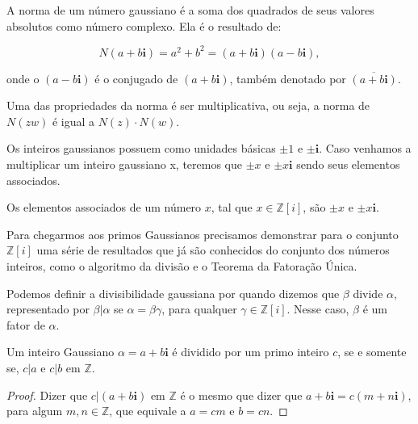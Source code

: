\begin{Df}
A norma de um n\'umero gaussiano \'e a soma dos quadrados de seus valores absolutos como n\'umero complexo. Ela \'e o resultado de:

$$N(a+b\textbf{i}) = a^2 + b^2 = (a+b\textbf{i})(a-b\textbf{i}),$$

onde o $(a-b\textbf{i})$ \'e o conjugado de $(a+b\textbf{i})$, tamb\'em denotado por $\overline{(a+b\textbf{i})}$.
\end{Df}

Uma das propriedades da norma \'e ser multiplicativa, ou seja, a norma de $N(zw)$ \'e igual a $N(z) \cdot N(w)$.

Os inteiros gaussianos possuem como unidades b\'asicas $\pm 1$ e $\pm \textbf{i}$. Caso venhamos a multiplicar um inteiro gaussiano x, teremos que $\pm x$ e $\pm x\textbf{i}$ sendo seus elementos associados.

\begin{Df}

Os elementos associados de um n\'umero $x$, tal que $x \in \mathbb{Z}[i]$, s\~ao $\pm x$ e $\pm x\textbf{i}$.

\end{Df}

Para chegarmos aos primos Gaussianos precisamos demonstrar para o conjunto $\mathbb{Z}[i]$ uma s\'erie de resultados que j\'a s\~ao conhecidos do conjunto dos n\'umeros inteiros, como o algoritmo da divis\~ao e o Teorema da Fatora\c{c}\~ao \'Unica.

Podemos definir a divisibilidade gaussiana por quando dizemos que $\beta$ divide $\alpha$, representado por $\beta | \alpha$ se $\alpha = \beta \gamma$, para qualquer $\gamma \in \mathbb{Z}[i] $. Nesse caso, $\beta$ \'e um fator de $\alpha$.

\begin{Th}\label{div_gaussiana1}

Um inteiro Gaussiano $\alpha = a+b\textbf{i}$ \'e dividido por um primo inteiro $c$, se e somente se, $c|a$ e $c|b$ em $\mathbb{Z}$.

\end{Th}

\begin{proof}

Dizer que $c|(a+b\textbf{i})$ em $\mathbb{Z}$ \'e o mesmo que dizer que $a+b\textbf{i} = c(m +  n\textbf{i})$, para algum $m, n \in \mathbb{Z}$, que equivale a $a=cm$ e $b=cn$.

\end{proof}

